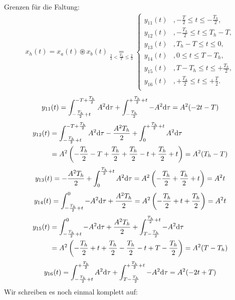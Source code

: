 \documentclass[11pt,a4paper,DIV=12]{scrartcl}
\begin{document}
Grenzen für die Faltung:
%
%
\begin{align}
	x_{h}(t)=x_{a}(t)\circledast x_{b}(t)
	\underset{\frac{2}{3}<\frac{T_h}{T}\leq\frac{2}{3}}{=}
	\begin{cases}
		y_{11}(t)&,-\frac{T}{2}\leq t \leq -\frac{T_h}{2}, \\
		y_{12}(t)&,-\frac{T_h}{2}\leq t \leq T_h-T, \\
		y_{13}(t)&,T_h-T\leq t \leq 0, \\
		y_{14}(t)&,0\leq t \leq T-T_h, \\
		y_{15}(t)&,T-T_h\leq t \leq +\frac{T_h}{2}, \\
		y_{16}(t)&,+\frac{T_h}{2}\leq t \leq +\frac{T}{2}. \\
	\end{cases}
\end{align}
%
%
\begin{align}
	y_{11}(t)=\int_{-\frac{T_h}{2}+t}^{-T+\frac{T_h}{2}}A^2\mathrm{d} \tau+\int_{-\frac{T_h}{2}}^{+\frac{T_h}{2}+t}-A^2\mathrm{d} \tau=A^2(-2t-T)
\end{align}
%
%
\begin{align}
	y_{12}(t)&=\int_{-\frac{T_h}{2}+t}^{-T+\frac{T_h}{2}}A^2\mathrm{d} \tau-\frac{A^2T_h}{2}+\int_0^{+\frac{T_h}{2}+t}A^2\mathrm{d} \tau\nonumber \\
	&=A^2\left(-\frac{T_h}{2}-T+\frac{T_h}{2}+\frac{T_h}{2}-t+\frac{T_h}{2}+t\right)=A^2(T_h-T)
\end{align}
%
%
\begin{align}
	y_{13}(t)=-\frac{A^2T_h}{2}+\int_0^{\frac{T_h}{2}+t}A^2\mathrm{d} \tau=A^2\left(-\frac{T_h}{2}+\frac{T_h}{2}+t\right)=A^2t
\end{align}
%
%
\begin{align}
	y_{14}(t)=\int_{-\frac{T_h}{2}+t}^{0}-A^2\mathrm{d} \tau+\frac{A^2T_h}{2}=A^2\left(-\frac{T_h}{2}+t+\frac{T_h}{2}\right)=A^2t
\end{align}
%
%
\begin{align}
	y_{15}(t)&=\int_{-\frac{T_h}{2}+t}^0-A^2\mathrm{d} \tau+\frac{A^2T_h}{2}+\int_{T-\frac{T_h}{2}}^{\frac{T_h}{2}+t}-A^2\mathrm{d} \tau\nonumber \\
	&=A^2\left(-\frac{T_h}{2}+t+\frac{T_h}{2}-\frac{T_h}{2}-t+T-\frac{T_h}{2}\right)=A^2(T-T_h)
\end{align}
%
%
\begin{align}
	y_{16}(t)=\int_{-\frac{T_h}{2}+t}^{+\frac{T_h}{2}}A^2\mathrm{d} \tau+\int_{T-\frac{T_h}{2}}^{+\frac{T_h}{2}+t}-A^2\mathrm{d} \tau=A^2(-2t+T)
\end{align}
%
%
Wir schreiben es noch einmal komplett auf:
\end{document}
